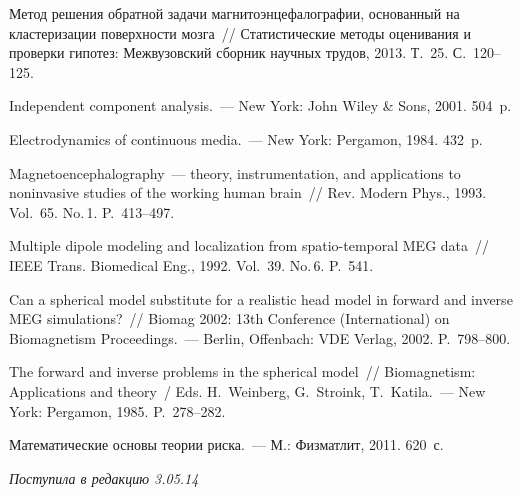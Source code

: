 \begin{multicols}{2}
{{\begin{thebibliography}{99}
 Метод
решения обратной задачи магнитоэнцефалографии, основанный на
кластеризации поверхности мозга~// Статистические методы оценивания
и проверки гипотез: Межвузовский сборник научных трудов, 2013.
Т.~25. С.~120--125.

  Independent
component analysis.~--- New York: John Wiley \& Sons, 2001. 504~p.

Electrodynamics of continuous media.~--- New York: Pergamon, 1984. 432~p.

 Magnetoencephalography~---
theory, instrumentation, and applications to noninvasive studies of
the working human brain~// Rev. Modern Phys., 1993. Vol.~65.
No.\,1. P.~413--497.

  Multiple dipole
modeling and localization from spatio-temporal MEG data~// IEEE
Trans. Biomedical Eng., 1992. Vol.~39. No.\,6. P.~541.

 Can a spherical model
substitute for a realistic head model in forward and inverse MEG
simulations?~// Biomag 2002: 13th Conference (International) on Biomagnetism
Proceedings.~--- Berlin, Offenbach: VDE Verlag, 2002. P.~798--800.

 The forward
and inverse problems in the spherical model~// Biomagnetism:
Applications and theory~/
Eds. H.~Weinberg, G.~Stroink,  T.~Katila.~--- New York: Pergamon, 1985. P.~278--282.

 Математические
основы теории риска.~--- М.: Физматлит, 2011. 620~с.

\end{thebibliography}
} }

\end{multicols}

\vspace*{-6pt}

\hfill{\small\textit{Поступила в редакцию 3.05.14}}

\newpage


